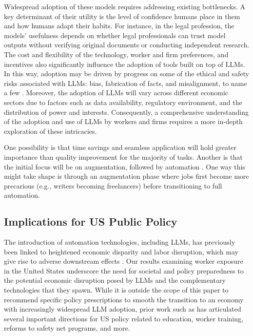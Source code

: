 \documentclass[11pt]{article}
\begin{document}
Widespread adoption of these models requires addressing existing bottlenecks. A key determinant of their utility is the level of confidence humans place in them and how humans adapt their habits. For instance, in the legal profession, the models' usefulness depends on whether legal professionals can trust model outputs without verifying original documents or conducting independent research. The cost and flexibility of the technology, worker and firm preferences, and incentives also significantly influence the adoption of tools built on top of LLMs. In this way, adoption may be driven by progress on some of the ethical and safety risks associated with LLMs: bias, fabrication of facts, and misalignment, to name a few \cite{4systemcard}. Moreover, the adoption of LLMs will vary across different economic sectors due to factors such as data availability, regulatory environment, and the distribution of power and interests. Consequently, a comprehensive understanding of the adoption and use of LLMs by workers and firms requires a more in-depth exploration of these intricacies.

One possibility is that time savings and seamless application will hold greater importance than quality improvement for the majority of tasks. Another is that the initial focus will be on augmentation, followed by automation \citep{huang2018artificial}. One way this might take shape is through an augmentation phase where jobs first become more precarious (e.g., writers becoming freelancers) before transitioning to full automation.

\subsection{Implications for US Public Policy}

The introduction of automation technologies, including LLMs, has previously been linked to heightened economic disparity and labor disruption, which may give rise to adverse downstream effects \citep{acemoglu2022demographics, Acemoglu2002, Moll2021, Klinova2021, Weidinger2021, Weidinger2022}. Our results examining worker exposure in the United States underscore the need for societal and policy preparedness to the potential economic disruption posed by LLMs and the complementary technologies that they spawn. While it is outside the scope of this paper to recommend specific policy prescriptions to smooth the transition to an economy with increasingly widespread LLM adoption, prior work such as \citep{Autor2022} has articulated several important directions for US policy related to education, worker training, reforms to safety net programs, and more. 
\end{document}
